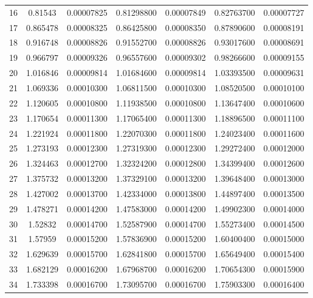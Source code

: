 \begin{table}[h]
{\begin{tabular}{ccccccc}
  16        & 0.81543        & 0.00007825 & 0.81298800 & 0.00007849 & 0.82763700 & 0.00007727 \\
  17        & 0.865478       & 0.00008325 & 0.86425800 & 0.00008350 & 0.87890600 & 0.00008191 \\
  18        & 0.916748       & 0.00008826 & 0.91552700 & 0.00008826 & 0.93017600 & 0.00008691 \\
  19        & 0.966797       & 0.00009326 & 0.96557600 & 0.00009302 & 0.98266600 & 0.00009155 \\
  20        & 1.016846       & 0.00009814 & 1.01684600 & 0.00009814 & 1.03393500 & 0.00009631 \\
  21        & 1.069336       & 0.00010300 & 1.06811500 & 0.00010300 & 1.08520500 & 0.00010100 \\
  22        & 1.120605       & 0.00010800 & 1.11938500 & 0.00010800 & 1.13647400 & 0.00010600 \\
  23        & 1.170654       & 0.00011300 & 1.17065400 & 0.00011300 & 1.18896500 & 0.00011100 \\
  24        & 1.221924       & 0.00011800 & 1.22070300 & 0.00011800 & 1.24023400 & 0.00011600 \\
  25        & 1.273193       & 0.00012300 & 1.27319300 & 0.00012300 & 1.29272400 & 0.00012000 \\
  26        & 1.324463       & 0.00012700 & 1.32324200 & 0.00012800 & 1.34399400 & 0.00012600 \\
  27        & 1.375732       & 0.00013200 & 1.37329100 & 0.00013200 & 1.39648400 & 0.00013000 \\
  28        & 1.427002       & 0.00013700 & 1.42334000 & 0.00013800 & 1.44897400 & 0.00013500 \\
  29        & 1.478271       & 0.00014200 & 1.47583000 & 0.00014200 & 1.49902300 & 0.00014000 \\
  30        & 1.52832        & 0.00014700 & 1.52587900 & 0.00014700 & 1.55273400 & 0.00014500 \\
  31        & 1.57959        & 0.00015200 & 1.57836900 & 0.00015200 & 1.60400400 & 0.00015000 \\
  32        & 1.629639       & 0.00015700 & 1.62841800 & 0.00015700 & 1.65649400 & 0.00015400 \\
  33        & 1.682129       & 0.00016200 & 1.67968700 & 0.00016200 & 1.70654300 & 0.00015900 \\
  34        & 1.733398       & 0.00016700 & 1.73095700 & 0.00016700 & 1.75903300 & 0.00016400 \\

\end{tabular}}
\end{table}
